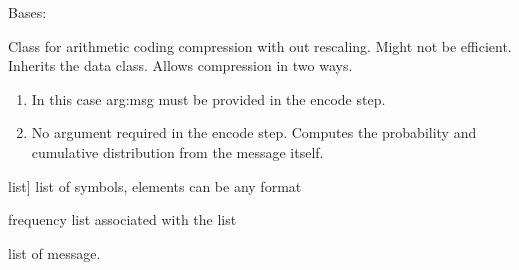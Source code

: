 \documentclass[letterpaper,10pt,english]{sphinxmanual}
\begin{document}
\begin{fulllineitems}
\label{\detokenize{arithmetic_coding:arithmetic_coding.ArithmeticCoding}}
\pysigstartsignatures
{}
\pysigstopsignatures
\sphinxAtStartPar
Bases: {\hyperref[\detokenize{core:core.data.Data}]{}}

\sphinxAtStartPar
Class for arithmetic coding compression with out rescaling. Might not be efficient. Inherits the data class. Allows compression in two ways.
\begin{enumerate}
%
\item {} \begin{description}
\sphinxAtStartPar
In this case arg:msg must be provided in the encode step.

\end{description}

\item {} \begin{description}
\sphinxAtStartPar
No argument required in the encode step. 
Computes the probability and cumulative distribution from the message itself.

\end{description}

\end{enumerate}
\begin{description}
\begin{description}
\sphinxlineitem{symbols}{[}list{]}
\sphinxAtStartPar
list of symbols, elements can be any format

\sphinxAtStartPar
frequency list associated with the list

\sphinxAtStartPar
list of message.

\end{description}


\end{description}
\end{fulllineitems}
\end{document}
